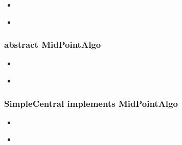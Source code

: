 	
	\begin{itemize}
		\item 
		\begin{description}
			\item 
		\end{description}
	\end{itemize}
	\begin{itemize}
		\item 
		\begin{description}
			\item 
		\end{description}
	\end{itemize}
	
	
	
	\subsubsection{abstract MidPointAlgo}
	
	
	\begin{itemize}
		\item 
		\begin{description}
			\item 
		\end{description}
	\end{itemize}
	\begin{itemize}
		\item 
		\begin{description}
			\item 
		\end{description}
	\end{itemize}
	
	
	
	\subsubsection{SimpleCentral implements MidPointAlgo}
	
	\begin{itemize}
		\item 
		\begin{description}
			\item 
		\end{description}
	\end{itemize}
	\begin{itemize}
		\item 
		\begin{description}
			\item 
		\end{description}
	\end{itemize}
	
